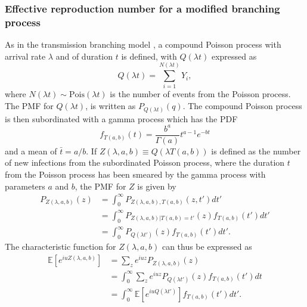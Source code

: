 \documentclass[sr]{drdc-report}
\newcommand{\Pois}{\ensuremath{\mathrm{Pois}}}
\newcommand{\ex}[1]{\mathbb{E}\left[#1\right]}
\begin{document}
\subsubsection{Effective reproduction number for a modified branching process}
As in the transmission branching model \cite{branchsim}, a compound Poisson process with arrival rate $\lambda$ and of duration $t$ is defined, with $Q(\lambda t)$ expressed as
\begin{equation}
Q(\lambda t)=\sum_{i=1}^{N(\lambda t)}Y_i,
\end{equation}
where $N(\lambda t)\sim\Pois(\lambda t)$ is the number of events from the Poisson process.
The PMF for $Q(\lambda t)$, is written as $P_{Q(\lambda t)}(q)$.
The compound Poisson process is then subordinated with a gamma process which has the PDF
\begin{equation}
f_{T(a,b)}(t)=\frac{b^a}{\Gamma(a)}t^{a-1}e^{-bt}\label{gammaPDF}
\end{equation}
and a mean of $\bar{t}=a/b$.
If $Z(\lambda,a,b)\equiv Q(\lambda T(a,b))$ is defined as the number of new infections from the subordinated Poisson process, where the duration $t$ from the Poisson process has been smeared by the gamma process with parameters $a$ and $b$, the PMF for $Z$ is given by
\begin{align}
P_{Z(\lambda,a,b)}(z) & = \int_0^\infty P_{Z(\lambda,a,b),T(a,b)}(z,t')dt'\nonumber\\
& = \int_0^\infty P_{Z(\lambda,a,b)|T(a,b)=t'}(z)f_{T(a,b)}(t')dt'\nonumber\\
& = \int_0^\infty P_{Q(\lambda t')}(z)f_{T(a,b)}(t')dt'.
\end{align}
The characteristic function for $Z(\lambda,a,b)$ can thus be expressed as
\begin{align}
\ex{e^{iuZ(\lambda,a,b)}} & = \sum_z e^{iuz}P_{Z(\lambda,a,b)}(z)\nonumber\\
& = \int_0^\infty \sum_z e^{iuz}P_{Q(\lambda t')}(z)f_{T(a,b)}(t')dt\nonumber\\
& = \int_0^\infty \ex{e^{iuQ(\lambda t')}}f_{T(a,b)}(t')dt'.\label{ZCF}
\end{align}
\end{document}
